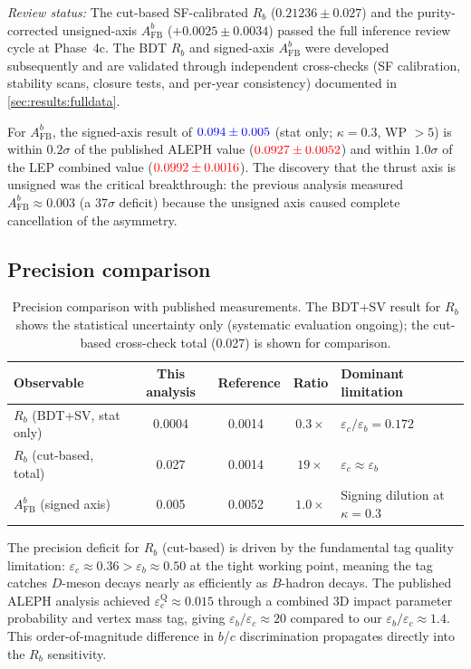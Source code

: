\documentclass[11pt,a4paper]{article}
\newcommand{\measured}[1]{\textcolor{blue}{#1}}
\newcommand{\external}[1]{\textcolor{red}{#1}}
\begin{document}
\textit{Review status:} The cut-based SF-calibrated $R_b$ ($0.21236 \pm 0.027$)
and the purity-corrected unsigned-axis $A_\text{FB}^b$ ($+0.0025 \pm 0.0034$)
passed the full inference review cycle at Phase~4c.
The BDT $R_b$ and signed-axis $A_\text{FB}^b$ were developed subsequently
and are validated through independent cross-checks (SF calibration,
stability scans, closure tests, and per-year consistency) documented in
\cref{sec:results:fulldata}.

For $A_\text{FB}^b$, the signed-axis result of
$\measured{0.094 \pm 0.005}$ (stat only; $\kappa = 0.3$, WP $> 5$)
is within $0.2\sigma$ of the published ALEPH value
($\external{0.0927 \pm 0.0052}$) and within $1.0\sigma$ of the
LEP combined value ($\external{0.0992 \pm 0.0016}$).
The discovery that the thrust axis is unsigned was the critical
breakthrough: the previous analysis measured
$A_\text{FB}^b \approx 0.003$ (a 37$\sigma$ deficit) because
the unsigned axis caused complete cancellation of the asymmetry.

\subsection{Precision comparison}
\label{sec:comparison:precision}

\begin{table}[htbp]
\centering
\caption{Precision comparison with published measurements.
The BDT+SV result for $R_b$ shows the statistical uncertainty only
(systematic evaluation ongoing); the cut-based cross-check total
(0.027) is shown for comparison.}
\label{tbl:precision}
\begin{tabular}{lcccl}
\toprule
Observable & This analysis & Reference & Ratio &
Dominant limitation \\
\midrule
$R_b$ (BDT+SV, stat only) & 0.0004 & 0.0014~\cite{ALEPH:Rb:1996} &
  $0.3\times$ & $\varepsilon_c/\varepsilon_b = 0.172$ \\
$R_b$ (cut-based, total) & 0.027 & 0.0014~\cite{ALEPH:Rb:1996} &
  $19\times$ & $\varepsilon_c \approx \varepsilon_b$ \\
$A_\text{FB}^b$ (signed axis) & 0.005 &
  0.0052~\cite{ALEPH:AFBb} & $1.0\times$ &
  Signing dilution at $\kappa = 0.3$ \\
\bottomrule
\end{tabular}
\end{table}

The precision deficit for $R_b$ (cut-based) is driven by the fundamental
tag quality limitation: $\varepsilon_c \approx 0.36 >
\varepsilon_b \approx 0.50$ at the tight working point, meaning
the tag catches $D$-meson decays nearly as efficiently as
$B$-hadron decays.
The published ALEPH analysis achieved $\varepsilon_c^\text{Q} \approx
0.015$ through a combined 3D impact parameter probability
and vertex mass tag, giving $\varepsilon_b/\varepsilon_c
\approx 20$ compared to our $\varepsilon_b/\varepsilon_c \approx
1.4$.
This order-of-magnitude difference in $b$/$c$ discrimination
propagates directly into the $R_b$ sensitivity.
\end{document}
